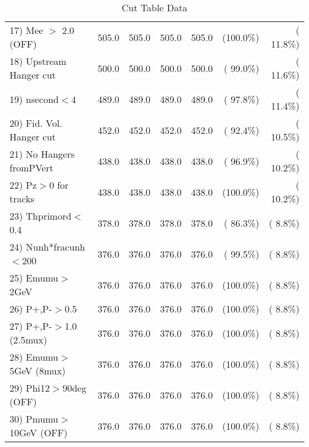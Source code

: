 \begin{table}[h!]
\begin{tabular}{||l||r|r|r|r|r|r||}
 17) Mee $>$ 2.0  (OFF)   &        505.0 &        505.0 &        505.0 &        505.0 & (100.0\%) & ( 11.8\%) \\
 18) Upstream Hanger cut  &        500.0 &        500.0 &        500.0 &        500.0 & ( 99.0\%) & ( 11.6\%) \\
 19) nsecond$<$4          &        489.0 &        489.0 &        489.0 &        489.0 & ( 97.8\%) & ( 11.4\%) \\
 20) Fid. Vol. Hanger cut &        452.0 &        452.0 &        452.0 &        452.0 & ( 92.4\%) & ( 10.5\%) \\
 21) No Hangers fromPVert &        438.0 &        438.0 &        438.0 &        438.0 & ( 96.9\%) & ( 10.2\%) \\
 22) Pz$>$0 for tracks    &        438.0 &        438.0 &        438.0 &        438.0 & (100.0\%) & ( 10.2\%) \\
 23) Thprimord$<$0.4      &        378.0 &        378.0 &        378.0 &        378.0 & ( 86.3\%) & (  8.8\%) \\
 24) Nunh*fracunh$<$200   &        376.0 &        376.0 &        376.0 &        376.0 & ( 99.5\%) & (  8.8\%) \\
 25) Emumu$>$2GeV         &        376.0 &        376.0 &        376.0 &        376.0 & (100.0\%) & (  8.8\%) \\
 26) P+,P-$>$0.5          &        376.0 &        376.0 &        376.0 &        376.0 & (100.0\%) & (  8.8\%) \\
 27) P+,P-$>$1.0 (2.5mux) &        376.0 &        376.0 &        376.0 &        376.0 & (100.0\%) & (  8.8\%) \\
 28) Emumu$>$5GeV  (8mux) &        376.0 &        376.0 &        376.0 &        376.0 & (100.0\%) & (  8.8\%) \\
 29) Phi12$>$90deg  (OFF) &        376.0 &        376.0 &        376.0 &        376.0 & (100.0\%) & (  8.8\%) \\
 30) Pmumu$>$10GeV  (OFF) &        376.0 &        376.0 &        376.0 &        376.0 & (100.0\%) & (  8.8\%) \\
 \hline
 \hline
 \end{tabular}
 \caption{Cut Table  Data     }
 \label{tab-cutcohjpsi-mumu_data}
 \end{table}
